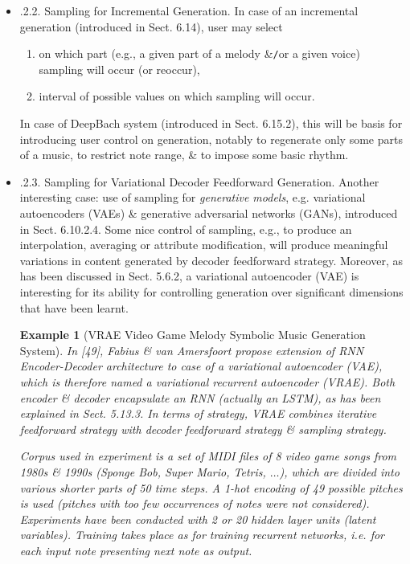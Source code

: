\documentclass{article}
\newtheorem{example}{Example}
\begin{document}
\begin{itemize}
\begin{itemize}
\begin{itemize}
\begin{itemize}
				This technique will be further generalized \& combined with conditioning strategy in order to control generation of notes at specific positions via positional constraints. This will be exemplified by Anticipation-RNN system to be introduced in Sect. 6.10.3.5.
				\item {.2.2. Sampling for Incremental Generation.} In case of an incremental generation (introduced in Sect. 6.14), user may select
				\begin{enumerate}
					\item on which part (e.g., a given part of a melody \&{\tt/}or a given voice) sampling will occur (or reoccur),
					\item interval of possible values on which sampling will occur.
				\end{enumerate}
				In case of DeepBach system (introduced in Sect. 6.15.2), this will be basis for introducing user control on generation, notably to regenerate only some parts of a music, to restrict note range, \& to impose some basic rhythm.
				\item {.2.3. Sampling for Variational Decoder Feedforward Generation.} Another interesting case: use of sampling for {\it generative models}, e.g. variational autoencoders (VAEs) \& generative adversarial networks (GANs), introduced in Sect. 6.10.2.4. Some nice control of sampling, e.g., to produce an interpolation, averaging or attribute modification, will produce meaningful variations in content generated by decoder feedforward strategy. Moreover, as has been discussed in Sect. 5.6.2, a variational autoencoder (VAE) is interesting for its ability for controlling generation over significant dimensions that have been learnt.
				\begin{example}[VRAE Video Game Melody Symbolic Music Generation System]
					In [49], {\sc Fabius \& van Amersfoort} propose extension of RNN Encoder-Decoder architecture to case of a variational autoencoder (VAE), which is therefore named a variational recurrent autoencoder (VRAE). Both encoder \& decoder encapsulate an RNN (actually an LSTM), as has been explained in Sect. 5.13.3. In terms of strategy, VRAE combines iterative feedforward strategy with decoder feedforward strategy \& sampling strategy.
					
					Corpus used in experiment is a set of MIDI files of 8 video game songs from 1980s \& 1990s (Sponge Bob, Super Mario, Tetris, $\ldots$), which are divided into various shorter parts of 50 time steps. A 1-hot encoding of 49 possible pitches is used (pitches with too few occurrences of notes were not considered). Experiments have been conducted with 2 or 20 hidden layer units (latent variables). Training takes place as for training recurrent networks, i.e. for each input note presenting next note as output.
					

\end{example}
\end{itemize}
\end{itemize}
\end{itemize}
\end{itemize}
\end{document}
